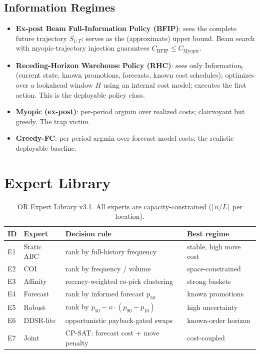 \documentclass[11pt,a4paper]{article}
\begin{document}
\subsection{Information Regimes}

\begin{itemize}
\item \textbf{Ex-post Beam Full-Information Policy (BFIP)}: sees the
complete future trajectory $S_{1:T}$; serves as the (approximate) upper
bound. Beam search with myopic-trajectory injection guarantees
$C_{\text{BFIP}} \leq C_{\text{Myopic}}$.
\item \textbf{Receding-Horizon Warehouse Policy (RHC)}: sees only
$\text{Information}_t$ (current state, known promotions, forecasts, known
cost schedules); optimizes over a lookahead window $H$ using an internal
cost model; executes the first action. This is the deployable policy class.
\item \textbf{Myopic (ex-post)}: per-period argmin over realized costs;
clairvoyant but greedy. The trap victim.
\item \textbf{Greedy-FC}: per-period argmin over forecast-model costs; the
realistic deployable baseline.
\end{itemize}

\section{Expert Library}\label{sec:experts}

\begin{table}[h]
\centering
\caption{OR Expert Library v3.1. All experts are capacity-constrained
($\lceil n/L \rceil$ per location).}
\label{tab:experts}
\begin{tabular}{llll}
\toprule
ID & Expert & Decision rule & Best regime \\
\midrule
E1 & Static ABC & rank by full-history frequency & stable, high move cost \\
E2 & COI & rank by frequency / volume & space-constrained \\
E3 & Affinity & recency-weighted co-pick clustering & strong baskets \\
E4 & Forecast & rank by informed forecast $p_{50}$ & known promotions \\
E5 & Robust & rank by $p_{50} - \kappa \cdot (p_{90} - p_{10})$ & high uncertainty \\
E6 & DDSR-lite & opportunistic payback-gated swaps & known-order horizon \\
E7 & Joint & CP-SAT: forecast cost + move penalty & cost-coupled \\
\bottomrule
\end{tabular}
\end{table}
\end{document}
